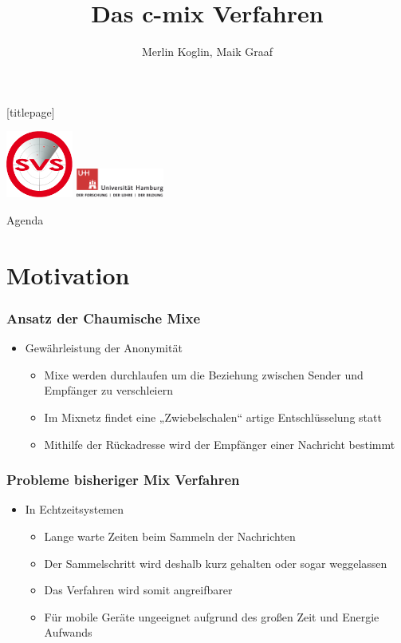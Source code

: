\documentclass[t, xcolor=dvipsnames]{beamer}
\title{Das c-mix Verfahren }
\author[Merlin Koglin, Maik Graaf]{Merlin Koglin, Maik Graaf}
\date{}
\begin{document}
\begingroup
	[titlepage]
	\begin{frame}[plain]
		\vskip8mm
		\includegraphics[width=2.2cm]{pic/svs_logo_uhhred.png}
		\titlepage
		\vspace{\fill}
		\includegraphics[width=2.9cm]{pic/UHH-Logo_2010_Farbe_RGB_hires_nomargin.png}
		\vskip20pt
	\end{frame}
\endgroup

\begin{frame}{Agenda}
	\tableofcontents
\end{frame}

\section{Motivation} %


\begin{frame}
	\frametitle{Ansatz der Chaumische Mixe}
	\begin{itemize}
		\item Gewährleistung der Anonymität
			\begin{itemize}
				\item Mixe werden durchlaufen um die Beziehung zwischen Sender und Empfänger zu verschleiern
		        \item Im Mixnetz findet eine „Zwiebelschalen“ artige Entschlüsselung statt
		        \item Mithilfe der Rückadresse wird der Empfänger einer Nachricht bestimmt
			\end{itemize}
	\end{itemize}
	\vspace{\fill}
\end{frame}

\begin{frame}
	\frametitle{Probleme bisheriger Mix Verfahren}
	\begin{itemize}
		\item In Echtzeitsystemen
			\begin{itemize}
				\item Lange warte Zeiten beim Sammeln der Nachrichten
				\item Der Sammelschritt wird deshalb kurz gehalten oder sogar weggelassen
				\item Das Verfahren wird somit angreifbarer
				\item Für mobile Geräte ungeeignet aufgrund des großen Zeit und Energie Aufwands
			\end{itemize}
	\end{itemize}
	\vspace{\fill}
\end{frame}
\end{document}
